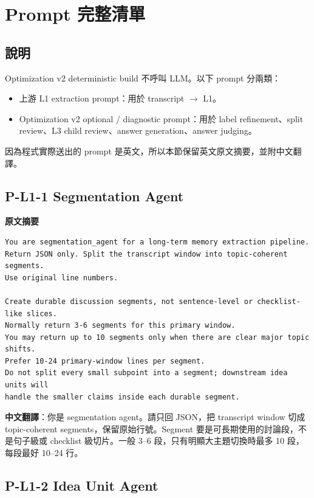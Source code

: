 \documentclass[11pt]{article}
\begin{document}
\section{Prompt 完整清單}

\subsection{說明}

Optimization v2 deterministic build 不呼叫 LLM。以下 prompt 分兩類：
\begin{itemize}
  \item 上游 L1 extraction prompt：用於 transcript \(\rightarrow\) L1。
  \item Optimization v2 optional / diagnostic prompt：用於 label refinement、split review、L3 child review、answer generation、answer judging。
\end{itemize}

因為程式實際送出的 prompt 是英文，所以本節保留英文原文摘要，並附中文翻譯。

\subsection{P-L1-1 Segmentation Agent}

\textbf{原文摘要}
\begin{Verbatim}
You are segmentation_agent for a long-term memory extraction pipeline.
Return JSON only. Split the transcript window into topic-coherent segments.
Use original line numbers.

Create durable discussion segments, not sentence-level or checklist-like slices.
Normally return 3-6 segments for this primary window.
You may return up to 10 segments only when there are clear major topic shifts.
Prefer 10-24 primary-window lines per segment.
Do not split every small subpoint into a segment; downstream idea units will
handle the smaller claims inside each durable segment.
\end{Verbatim}

\textbf{中文翻譯}：你是 segmentation agent。請只回 JSON，把 transcript window 切成 topic-coherent segments，保留原始行號。Segment 要是可長期使用的討論段，不是句子級或 checklist 級切片。一般 3--6 段，只有明顯大主題切換時最多 10 段，每段最好 10--24 行。

\subsection{P-L1-2 Idea Unit Agent}
\end{document}
